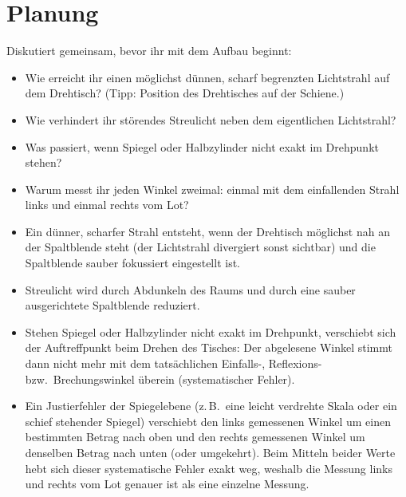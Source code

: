 \documentclass[11pt,a4paper]{article}
\newcommand{\zeichenraum}[1][4.5cm]{%
  \par\vspace{4pt}\noindent
  \fbox{\begin{minipage}[t][#1][t]{\dimexpr\linewidth-2\fboxsep-2\fboxrule}\ \end{minipage}}
  \vspace{4pt}
}
\begin{document}
\section{Planung}
\begin{aufgabebox}[{ (Plenum)}]
Diskutiert gemeinsam, bevor ihr mit dem Aufbau beginnt:
\begin{itemize}
  \item Wie erreicht ihr einen möglichst dünnen, scharf begrenzten Lichtstrahl auf dem Drehtisch? (Tipp: Position des Drehtisches auf der Schiene.)
  \item Wie verhindert ihr störendes Streulicht neben dem eigentlichen Lichtstrahl?
  \item Was passiert, wenn Spiegel oder Halbzylinder nicht exakt im Drehpunkt stehen?
  \item Warum messt ihr jeden Winkel zweimal: einmal mit dem einfallenden Strahl links und einmal rechts vom Lot?
\end{itemize}
\end{aufgabebox}
\zeichenraum[5.6cm]
\begin{solution}
\begin{loesungbox}
\begin{itemize}
  \item Ein dünner, scharfer Strahl entsteht, wenn der Drehtisch möglichst nah an der Spaltblende steht (der Lichtstrahl divergiert sonst sichtbar) und die Spaltblende sauber fokussiert eingestellt ist.
  \item Streulicht wird durch Abdunkeln des Raums und durch eine sauber ausgerichtete Spaltblende reduziert.
  \item Stehen Spiegel oder Halbzylinder nicht exakt im Drehpunkt, verschiebt sich der Auftreffpunkt beim Drehen des Tisches: Der abgelesene Winkel stimmt dann nicht mehr mit dem tatsächlichen Einfalls-, Reflexions- bzw.\ Brechungswinkel überein (systematischer Fehler).
  \item Ein Justierfehler der Spiegelebene (z.\,B.\ eine leicht verdrehte Skala oder ein schief stehender Spiegel) verschiebt den links gemessenen Winkel um einen bestimmten Betrag nach oben und den rechts gemessenen Winkel um denselben Betrag nach unten (oder umgekehrt). Beim Mitteln beider Werte hebt sich dieser systematische Fehler exakt weg, weshalb die Messung links und rechts vom Lot genauer ist als eine einzelne Messung.
\end{itemize}
\end{loesungbox}
\end{solution}
\end{document}
